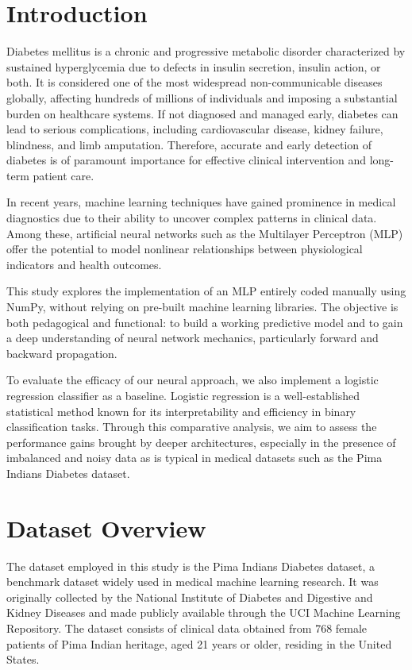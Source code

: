\documentclass[12pt]{article}
\begin{document}
\section{Introduction}

Diabetes mellitus is a chronic and progressive metabolic disorder characterized by sustained hyperglycemia due to defects in insulin secretion, insulin action, or both. It is considered one of the most widespread non-communicable diseases globally, affecting hundreds of millions of individuals and imposing a substantial burden on healthcare systems. If not diagnosed and managed early, diabetes can lead to serious complications, including cardiovascular disease, kidney failure, blindness, and limb amputation. Therefore, accurate and early detection of diabetes is of paramount importance for effective clinical intervention and long-term patient care.

In recent years, machine learning techniques have gained prominence in medical diagnostics due to their ability to uncover complex patterns in clinical data. Among these, artificial neural networks such as the Multilayer Perceptron (MLP) offer the potential to model nonlinear relationships between physiological indicators and health outcomes.

This study explores the implementation of an MLP entirely coded manually using NumPy, without relying on pre-built machine learning libraries. The objective is both pedagogical and functional: to build a working predictive model and to gain a deep understanding of neural network mechanics, particularly forward and backward propagation.

To evaluate the efficacy of our neural approach, we also implement a logistic regression classifier as a baseline. Logistic regression is a well-established statistical method known for its interpretability and efficiency in binary classification tasks. Through this comparative analysis, we aim to assess the performance gains brought by deeper architectures, especially in the presence of imbalanced and noisy data as is typical in medical datasets such as the Pima Indians Diabetes dataset.


\section{Dataset Overview}

The dataset employed in this study is the Pima Indians Diabetes dataset, a benchmark dataset widely used in medical machine learning research. It was originally collected by the National Institute of Diabetes and Digestive and Kidney Diseases and made publicly available through the UCI Machine Learning Repository. The dataset consists of clinical data obtained from 768 female patients of Pima Indian heritage, aged 21 years or older, residing in the United States.
\end{document}

